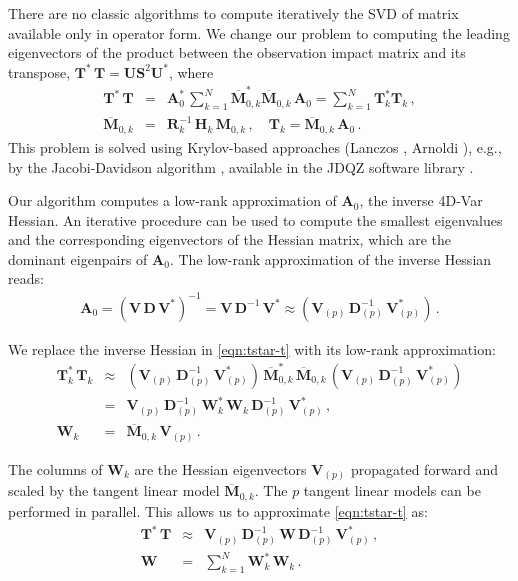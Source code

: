 \documentclass[final,sort&compress]{elsarticle}
\newcommand{\Sm}{\mathbf{S}}
\newcommand{\Vm}{\mathbf{V}}
\newcommand{\Um}{\mathbf{U}}
\newcommand{\Dm}{\mathbf{D}}
\newcommand{\T}{\mathbf{T}}
\newcommand{\M}{\mathbf{M}}
\newcommand{\HH}{\mathbf H}
\newcommand{\A}{\mathbf{A}}
\newcommand{\R}{\mathbf{R}}
\newcommand{\V}{ \mathbf{V} }
\newcommand{\W}{ \mathbf{W} }
\begin{document}
There are no classic algorithms to compute iteratively the SVD of matrix available only in operator form.
We change our problem to computing the leading eigenvectors of the product between the observation impact matrix and its transpose, $\T^*\,\T = \Um \Sm^2 \Um^*$, where
\begin{eqnarray}
\label{eqn:tstar-t}
 \T^*\,\T &=& \A_0^* \, \sum_{k=1}^N \overline{\M}_{0,k}^* \overline{\M}_{0,k} \,  \A_0 =  \sum_{k=1}^N \T_k^* \T_k\,, \\
 \nonumber
\overline{\M}_{0,k} &=&  \R_k^{-1}\, \HH_k\, \M_{0,k}\,, \quad
\T_k = \overline{\M}_{0,k}  \, \A_0\,.
\end{eqnarray}
This problem is solved using Krylov-based approaches (Lanczos \cite{lanczos1950iteration}, Arnoldi \cite{arnoldi1951principle}), e.g.,
by the Jacobi-Davidson algorithm \cite{sleijpen2000jacobi}, available in the JDQZ software library \cite{fokkema1999short}.

Our algorithm computes a low-rank approximation of $\A_0$, the inverse 4D-Var Hessian.
An iterative procedure can be used to compute the smallest eigenvalues and the corresponding eigenvectors of the Hessian matrix,
which are the dominant eigenpairs of $\A_0$.
The low-rank approximation of the inverse Hessian reads:
\begin{eqnarray}
 \label{eqn:svdhess}
 \A_0 = \left(\Vm\,\Dm\,\Vm^*\right)^{-1} = \Vm\,\Dm^{-1}\,\Vm^* \approx \left(\Vm_{(p)}\,\Dm_{(p)}^{-1}\,\Vm_{(p)}^*\right)\,.
\end{eqnarray}

We replace the inverse Hessian in \eqref{eqn:tstar-t} with its low-rank approximation: 
\begin{eqnarray}
 \T_k^*\,\T_k &\approx & \left(\Vm_{(p)} \,\Dm_{(p)}^{-1} \, \Vm_{(p)}^*\right)\,\overline{\M}_{0,k}^*\,\overline{\M}_{0,k}\,\left(\Vm_{(p)}\,\Dm_{(p)}^{-1}\,\Vm_{(p)}^*\right) \nonumber \\
           &=& \Vm_{(p)}\,\Dm_{(p)}^{-1}\,\W_k^*\,\W_k\,\Dm_{(p)}^{-1}\,\Vm_{(p)}^*\,, \nonumber \\
\W_k &=& \overline{\M}_{0,k}\,\Vm_{(p)}   \,.       \label{eqn:tlmeig} 
\end{eqnarray}

The columns of $\W_k$ are the Hessian eigenvectors $\Vm_{(p)}$ propagated forward and scaled by the tangent linear model $\overline{\M}_{0,k}$. 
The $p$ tangent linear models can be performed in parallel.
This allows us to approximate \eqref{eqn:tstar-t} as:
\begin{eqnarray*}
 \T^*\,\T &\approx& \V_{(p)}\,\Dm_{(p)}^{-1} \, \W \, \Dm_{(p)}^{-1}\,\V_{(p)}^*\,, \\
 \W &=& \sum_{k=1}^N  \W_k^*\,\W_k\,.
\end{eqnarray*}
\end{document}
